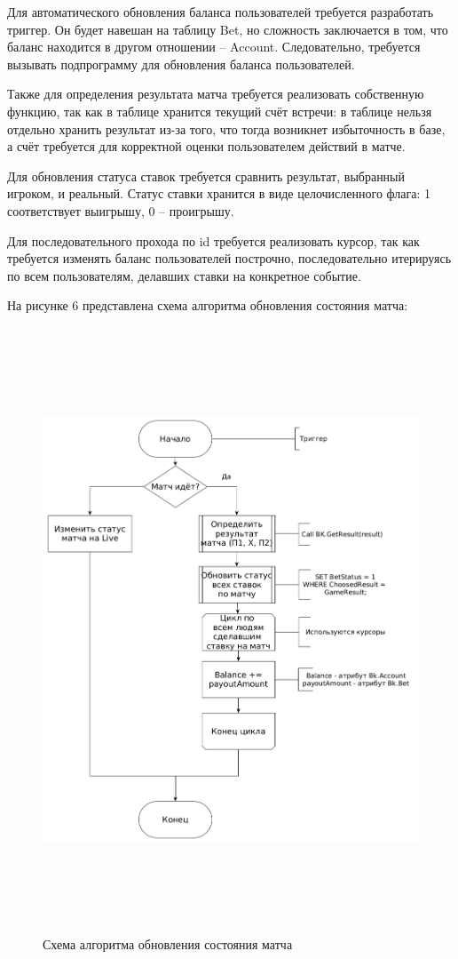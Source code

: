 Для автоматического обновления баланса пользователей требуется разработать триггер.
Он будет навешан на таблицу Bet, но сложность заключается в том, что баланс находится в другом отношении -- Account.
Следовательно, требуется вызывать подпрограмму для обновления баланса пользователей.

Также для определения результата матча требуется реализовать собственную функцию, так как в таблице хранится текущий счёт встречи: в таблице нельзя отдельно хранить результат из-за того, что тогда возникнет избыточность в базе, а счёт требуется для корректной оценки пользователем действий в матче. 

Для обновления статуса ставок требуется сравнить результат, выбранный игроком, и реальный. 
Статус ставки хранится в виде целочисленного флага: 1 соответствует выигрышу, 0 -- проигрышу.

Для последовательного прохода по id требуется реализовать курсор, так как требуется изменять баланс пользователей построчно, последовательно итерируясь по всем пользователям, делавших ставки на конкретное событие.

\newpage
На рисунке 6 представлена схема алгоритма обновления состояния матча:
\FloatBarrier
\begin{figure}[h]	
	\begin{center}
		\includegraphics[height=18cm, width=\linewidth]{inc/updateFlow.png}
	\end{center}
	\captionsetup{justification=centering, labelsep=defffis}
	\caption{Схема алгоритма обновления состояния матча}
	\label{fig::update}
\end{figure}
\FloatBarrier
